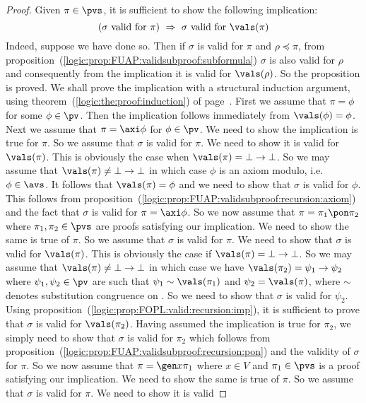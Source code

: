 \begin{proof}
Given $\pi\in\pvs$, it is sufficient to show the following
implication:
    \[
    (\mbox{$\sigma$ valid for $\pi$})\ \Rightarrow\ \mbox{$\sigma$ valid for
    $\vals(\pi)$}
    \]
Indeed, suppose we have done so. Then if $\sigma$ is valid for $\pi$
and $\rho\preceq\pi$, from
proposition~(\ref{logic:prop:FUAP:validsubproof:subformula})
$\sigma$ is also valid for $\rho$ and consequently from the
implication it is valid for $\vals(\rho)$. So the proposition is
proved. We shall prove the implication with a structural induction
argument, using theorem~(\ref{logic:the:proof:induction}) of
page~\pageref{logic:the:proof:induction}. First we assume that
$\pi=\phi$ for some $\phi\in\pv$. Then the implication follows
immediately from $\vals(\phi)=\phi$. Next we assume that
$\pi=\axi\phi$ for $\phi\in\pv$. We need to show the implication is
true for $\pi$. So we assume that $\sigma$ is valid for $\pi$. We
need to show it is valid for $\vals(\pi)$. This is obviously the
case when $\vals(\pi)=\bot\to\bot$. So we may assume that
$\vals(\pi)\neq\bot\to\bot$ in which case $\phi$ is an axiom modulo,
i.e. $\phi\in\avs$. It follows that $\vals(\pi)=\phi$ and we need to
show that $\sigma$ is valid for $\phi$. This follows from
proposition~(\ref{logic:prop:FUAP:validsubproof:recursion:axiom})
and the fact that $\sigma$ is valid for $\pi=\axi\phi$. So we now
assume that $\pi=\pi_{1}\pon\pi_{2}$ where $\pi_{1},\pi_{2}\in\pvs$
are proofs satisfying our implication. We need to show the same is
true of $\pi$. So we assume that $\sigma$ is valid for $\pi$. We
need to show that $\sigma$ is valid for $\vals(\pi)$. This is
obviously the case if $\vals(\pi)=\bot\to\bot$. So we may assume
that $\vals(\pi)\neq\bot\to\bot$ in which case we have
$\vals(\pi_{2})=\psi_{1}\to\psi_{2}$ where $\psi_{1},\psi_{2}\in\pv$
are such that $\psi_{1}\sim\vals(\pi_{1})$ and
$\psi_{2}=\vals(\pi)$, where $\sim$ denotes substitution congruence
on \pv. So we need to show that $\sigma$ is valid for $\psi_{2}$.
Using proposition~(\ref{logic:prop:FOPL:valid:recursion:imp}), it is
sufficient to prove that $\sigma$ is valid for $\vals(\pi_{2})$.
Having assumed the implication is true for $\pi_{2}$, we simply need
to show that $\sigma$ is valid for $\pi_{2}$ which follows from
proposition~(\ref{logic:prop:FUAP:validsubproof:recursion:pon}) and
the validity of $\sigma$ for $\pi$. So we now assume that $\pi=\gen
x\pi_{1}$ where $x\in V$ and $\pi_{1}\in\pvs$ is a proof satisfying
our implication. We need to show the same is true of $\pi$. So we
assume that $\sigma$ is valid for $\pi$. We need to show it is valid

\end{proof}
